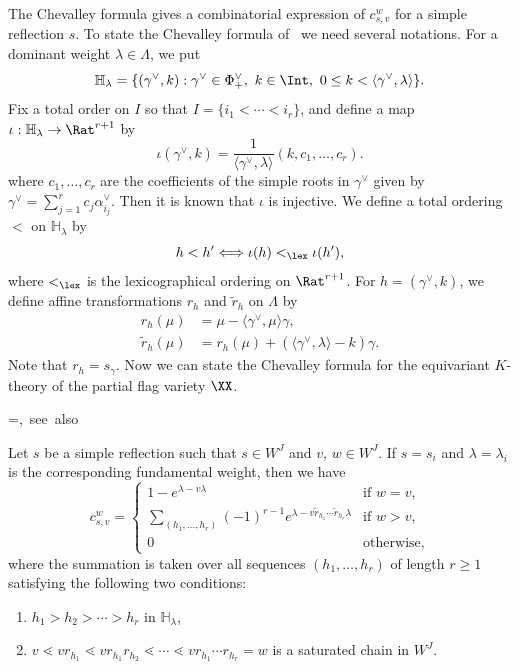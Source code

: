 The Chevalley formula gives a combinatorial expression of $c^w_{s,v}$ for a simple reflection $s$.
To state the Chevalley formula of~\cite{LS} we need several notations.
For a dominant weight $\lambda \in \Lambda$, we put
$$
\mathbb{H}_\lambda
 =
\{ (\gamma^\vee, k) : 
 \gamma^\vee \in \Phi^\vee_+, \ k \in \Int, \ 0 \le k < \langle \gamma^\vee, \lambda \rangle
\}.
$$
Fix a total order on $I$ so that $I = \{ i_1 < \cdots < i_r \}$, 
and define a map $\iota : \mathbb{H}_\lambda \to \Rat^{r+1}$ by
$$
\iota \left(\gamma^\vee , k \right)
 =
\frac{ 1 }
 { \langle \gamma^\vee, \lambda \rangle }
\left( k, c_1, \ldots, c_r \right).
$$
where $c_1, \dots, c_r$ are the coefficients of the simple roots in $\gamma^\vee$ 
given by $\gamma^\vee = \sum_{j=1}^r c_j \alpha^\vee_{i_j}$.
Then it is known that $\iota$ is injective.
We define a total ordering $<$ on $\mathbb{H}_\lambda$ by
$$
h < h' \Longleftrightarrow \iota(h) <_{\lex} \iota(h'),
$$
where $<_{\lex}$ is the lexicographical ordering on $\Rat^{r+1}$.
For $h = (\gamma^\vee, k)$, we define affine transformations $r_h$ and $\tilde{r}_h$ on $\Lambda$ by
\begin{align*}
r_h(\mu) &= \mu - \langle \gamma^\vee, \mu \rangle \gamma,
\\
\tilde{r}_h(\mu) &= r_h(\mu) + \left( \langle \gamma^\vee, \lambda \rangle - k \right) \gamma.
\end{align*}
Note that $r_h = s_{\gamma}$.
Now we can state the Chevalley formula for the equivariant $K$-theory of the partial flag variety $\XX$.

\setbox\toto=\hbox {\cite[Theorem~4.8~(4.12) and~(4.13)]{LS}, see also~\cite[Corollary~7.1]{LP}}
\begin{prop}[\box\toto]
\label{prop:Chevalley}
Let $s$ be a simple reflection such that $s \in W^J$ and $v$, $w \in W^J$.
If $s = s_i$ and $\lambda = \lambda_i$ is the corresponding fundamental weight, then we have
\begin{equation}
\label{eq:Chevalley}
c^w_{s,v}
 =
\begin{cases}
 1 - e^{\lambda - v \lambda} &\text{if $w=v$},
\\
 \displaystyle\sum_{(h_1, \ldots, h_r)}
 (-1)^{r-1}
 e^{\lambda - v \tilde{r}_{h_1} \cdots \tilde{r}_{h_r} \lambda}
 &\text{if $w > v$,}
\\
 0 &\text{otherwise,}
\end{cases}
\end{equation}
where the summation is taken over all sequences $(h_1, \ldots, h_r)$ of length $r \ge 1$ 
satisfying the following two conditions:
\begin{enumerate}[(H1)]
\item\label{prop4.6_H1} %
$h_1 > h_2 > \cdots > h_r$ in $\mathbb{H}_\lambda$,
\item\label{prop4.6_H2} %
$v \lessdot v r_{h_1} \lessdot v r_{h_1} r_{h_2} \lessdot \cdots \lessdot v r_{h_1} \cdots r_{h_r} = w$ 
is a saturated chain in $W^J$.
\end{enumerate}
\end{prop}

